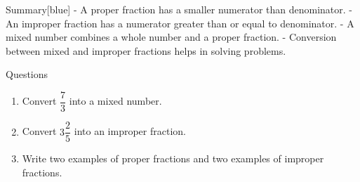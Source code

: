 \documentclass[12pt]{book}
\begin{document}
  \blockquote{}  
  \blockquote{}  
  \newpage
  \begin{flexbox}{Summary}[blue]
  - A proper fraction has a smaller numerator than denominator.  
  - An improper fraction has a numerator greater than or equal to denominator.  
  - A mixed number combines a whole number and a proper fraction.  
  - Conversion between mixed and improper fractions helps in solving problems.  
  \end{flexbox}
  
  \begin{flexbox}{Questions}
  \begin{enumerate}
    \item Convert $\dfrac{7}{3}$ into a mixed number.\vspace*{20pt}
    \item Convert $3 \dfrac{2}{5}$ into an improper fraction.\vspace*{20pt}
    \item Write two examples of proper fractions and two examples of improper fractions.\vspace*{20pt}
  \end{enumerate}
  \end{flexbox}
  
\end{document}
